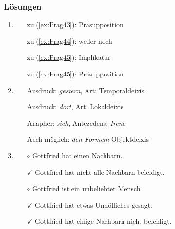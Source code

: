 {
\begin{frame}
	\frametitle{Lösungen}
\begin{enumerate}
	\item 
		\begin{itemize}
			\item[] zu (\ref{ex:Prag43}): Präsupposition
			\item[] zu (\ref{ex:Prag44}): weder noch
			\item[] zu (\ref{ex:Prag45}): Implikatur
			\item[] zu (\ref{ex:Prag45}): Präsupposition
		\end{itemize}
	
	\item 
		\begin{itemize}
			\item[] Ausdruck: \emph{gestern}, Art: Temporaldeixis
			\item[] Ausdruck: \emph{dort}, Art: Lokaldeixis
			\item[] Anapher: \emph{sich}, Antezedens: \emph{Irene}
			\item[] Auch möglich: \emph{den Formeln} \ras Objektdeixis	
		\end{itemize}
	
	\item 
		\begin{itemize}
			\item[$\circ$] Gottfried hat einen Nachbarn.
			\item[$\checkmark$] Gottfried hat nicht alle Nachbarn beleidigt.
			\item[$\circ$] Gottfried ist ein unbeliebter Mensch.
			\item[$\checkmark$] Gottfried hat etwas Unhöfliches gesagt.
			\item[$\checkmark$] Gottfried hat einige Nachbarn nicht beleidigt.
		\end{itemize}
	
\end{enumerate}
	
\end{frame}

}
